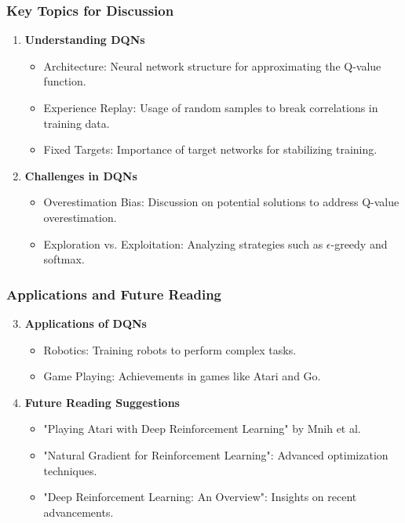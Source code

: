 \documentclass[aspectratio=169]{beamer}
\begin{document}
\begin{frame}[fragile]
    \frametitle{Key Topics for Discussion}
    \begin{enumerate}
        \item \textbf{Understanding DQNs}
            \begin{itemize}
                \item Architecture: Neural network structure for approximating the Q-value function.
                \item Experience Replay: Usage of random samples to break correlations in training data.
                \item Fixed Targets: Importance of target networks for stabilizing training.
            \end{itemize}
        \item \textbf{Challenges in DQNs}
            \begin{itemize}
                \item Overestimation Bias: Discussion on potential solutions to address Q-value overestimation.
                \item Exploration vs. Exploitation: Analyzing strategies such as $\epsilon$-greedy and softmax.
            \end{itemize}
    \end{enumerate}
\end{frame}

\begin{frame}[fragile]
    \frametitle{Applications and Future Reading}
    \begin{enumerate}
        \setcounter{enumi}{2}
        \item \textbf{Applications of DQNs}
            \begin{itemize}
                \item Robotics: Training robots to perform complex tasks.
                \item Game Playing: Achievements in games like Atari and Go.
            \end{itemize}
        \item \textbf{Future Reading Suggestions}
            \begin{itemize}
                \item "Playing Atari with Deep Reinforcement Learning" by Mnih et al.
                \item "Natural Gradient for Reinforcement Learning": Advanced optimization techniques.
                \item "Deep Reinforcement Learning: An Overview": Insights on recent advancements.
            \end{itemize}
    \end{enumerate}
\end{frame}
\end{document}
